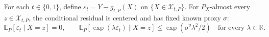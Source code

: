 For each \(t\in\{0,1\}\), define \(\varepsilon_t=Y-g_{t,P}(X)\) on \(\{X\in\mathcal X_{t,P}\}\). For \(P_X\)-almost every \(z\in\mathcal X_{t,P}\), the conditional residual is centered and has fixed known proxy \(\sigma\):
\[
 \mathbb E_P[\varepsilon_t\mid X=z]=0,
 \qquad
 \mathbb E_P[\exp(\lambda\varepsilon_t)\mid X=z]
 \le \exp(\sigma^2\lambda^2/2)
 \quad\text{for every }\lambda\in\mathbb R.
\]